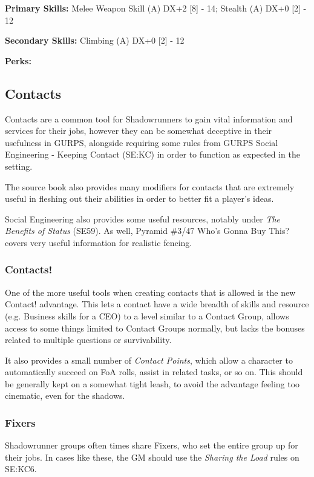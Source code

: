 \begin{multicols*}{2}
	\textbf{Primary Skills:}
	Melee Weapon Skill (A) DX+2 [8] - 14; Stealth (A) DX+0 [2] - 12
	
	
	\textbf{Secondary Skills:}
	Climbing (A) DX+0 [2] - 12
	
	
	\textbf{Perks:}
	
	
	
	\subsection{Contacts}\label{Contacts}
	
	Contacts are a common tool for Shadowrunners to gain vital information and services for their jobs, however they can be somewhat deceptive in their usefulness in GURPS, alongside requiring some rules from GURPS Social Engineering - Keeping Contact (SE:KC) in order to function as expected in the setting.
	
	The source book also provides many modifiers for contacts that are extremely useful in fleshing out their abilities in order to better fit a player's ideas.
	
	Social Engineering also provides some useful resources, notably under \textit{The Benefits of Status} (SE59). As well, Pyramid \#3/47 Who's Gonna Buy This? covers very useful information for realistic fencing.
	
	\subsubsection{Contacts!}
	
	One of the more useful tools when creating contacts that is allowed is the new Contact! advantage. This lets a contact have a wide breadth of skills and resource (e.g. Business skills for a CEO) to a level similar to a Contact Group, allows access to some things limited to Contact Groups normally, but lacks the bonuses related to multiple questions or survivability. 
	
	It also provides a small number of \textit{Contact Points}, which allow a character to automatically succeed on FoA rolls, assist in related tasks, or so on. This should be generally kept on a somewhat tight leash, to avoid the advantage feeling too cinematic, even for the shadows.
	
	\subsubsection{Fixers}
	
	Shadowrunner groups often times share Fixers, who set the entire group up for their jobs. In cases like these, the GM should use the \textit{Sharing the Load} rules on SE:KC6.
	

\end{multicols*}
